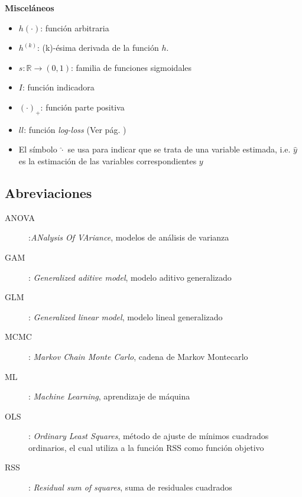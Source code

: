 \documentclass[../../Main/Main.tex]{subfiles}
\begin{document}
\textbf{Misceláneos}
\begin{itemize}[label={}]
	\item $h(\cdot)$: función arbitraria
	\item $h^{(k)}$: (k)-ésima derivada de la función $h$.
	\item $s: \mathbb{R} \rightarrow (0,1)$: familia de funciones sigmoidales
	\item $I$: función indicadora
	\item $(\cdot)_{+}$: función parte positiva
	\item $ll$: función \textit{log-loss} (Ver pág. \pageref{ec:LogLoss})
	\item El símbolo $\hat{\cdot}$ se usa para indicar que se trata de una variable estimada, i.e. $\hat{y}$ es la estimación de las variables correspondientes $y$
\end{itemize}

\subsection*{Abreviaciones}
\begin{description}
	\item[ANOVA]:\textit{ANalysis Of VAriance}, modelos de análisis de varianza
	\item[GAM]: \textit{Generalized aditive model}, modelo aditivo generalizado
	\item[GLM]: \textit{Generalized linear model}, modelo lineal generalizado
	\item[MCMC]: \textit{Markov Chain Monte Carlo}, cadena de Markov Montecarlo
	\item[ML]: \textit{Machine Learning}, aprendizaje de máquina
		\item[OLS]: \textit{Ordinary Least Squares}, método de ajuste de mínimos cuadrados ordinarios, el cual utiliza a la función RSS como función objetivo
	\item[RSS]: \textit{Residual sum of squares}, suma de residuales cuadrados
\end{description}
\end{document}
